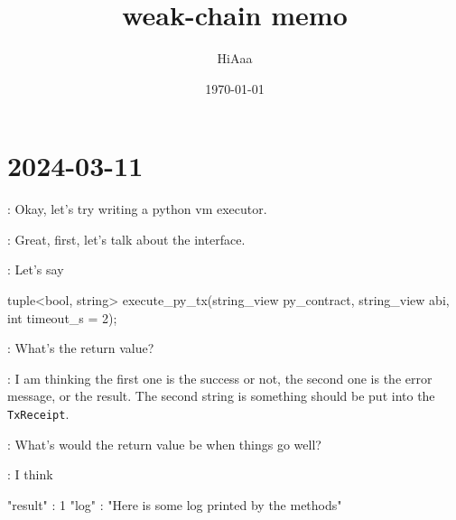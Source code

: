 \documentclass[dvipsnames]{article}
\title{weak-chain memo}
\date{\today}
\author{HiAaa}
\begin{document}
\maketitle
\tableofcontents{}
\newpage{}

% 
% 
% 
% 

\section*{2024-03-11}

 :  Okay, let's try writing a python vm executor.

 : Great, first, let's talk about the interface.

 : Let's say

\begin{simplec}
tuple<bool, string> execute_py_tx(string_view py_contract, string_view abi, int timeout_s = 2);
\end{simplec}

 : What's the return value?

 : I am thinking the first one is the success or not, the second
one is the error message, or the result. The second string is something should
be put into the \texttt{TxReceipt}.

 : What's would the return value be when things go well?

 : I think

\begin{simplejson}
{
    "result" : 1
    "log" : "Here is some log printed by the methods"
}
\end{simplejson}
\end{document}
